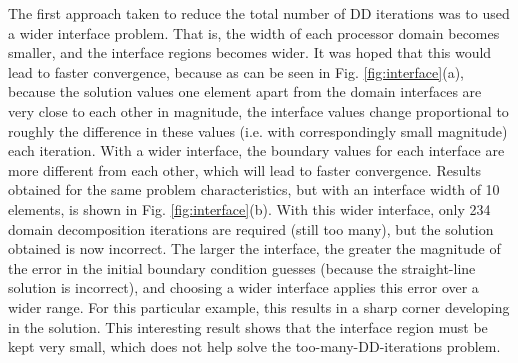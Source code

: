 \documentclass[10pt]{article}
\begin{document}
The first approach taken to reduce the total number of DD iterations was to used a wider interface problem. That is, the width of each processor domain becomes smaller, and the interface regions becomes wider. It was hoped that this would lead to faster convergence, because as can be seen in Fig. \ref{fig:interface}(a), because the solution values one element apart from the domain interfaces are very close to each other in magnitude, the interface values change proportional to roughly the difference in these values (i.e. with correspondingly small magnitude) each iteration. With a wider interface, the boundary values for each interface are more different from each other, which will lead to faster convergence. Results obtained for the same problem characteristics, but with an interface width of 10 elements, is shown in Fig. \ref{fig:interface}(b). With this wider interface, only 234 domain decomposition iterations are required (still too many), but the solution obtained is now incorrect. The larger the interface, the greater the magnitude of the error in the initial boundary condition guesses (because the straight-line solution is incorrect), and choosing a wider interface applies this error over a wider range. For this particular example, this results in a sharp corner developing in the solution. This interesting result shows that the interface region must be kept very small, which does not help solve the too-many-DD-iterations problem.
\end{document}
